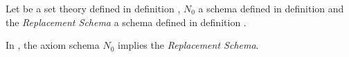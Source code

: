 Let  be a set theory defined in definition , $N_0$ a schema defined in definition  and the \emph{Replacement Schema} a schema defined in definition .
\begin{theorem} 
In , the axiom schema $N_0$ implies the \emph{Replacement Schema}.
\end{theorem}
